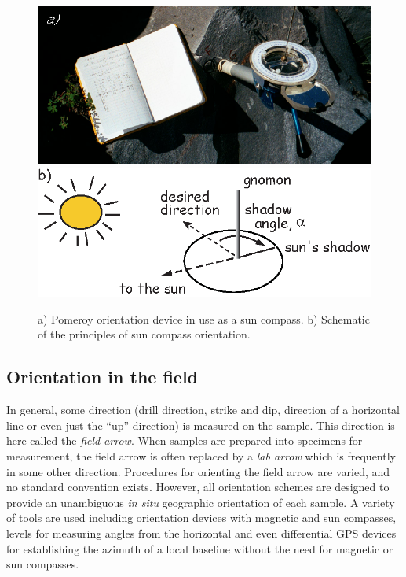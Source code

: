 \begin{figure}[htb]
\centering  \includegraphics[width=11 cm]{EPSfiles/orient.eps}
\centering  \includegraphics{EPSfiles/suncomp.eps}
\caption{a) Pomeroy orientation device in use as a sun compass.  b) Schematic of the principles of sun compass orientation.}
\label{fig:suncomp}
\end{figure}


 \subsection{Orientation in the field}
 
 In general, some direction (drill direction, strike and dip, direction of a horizontal line or even just the ``up'' direction) is measured on the sample.  This direction is here called the {\it field arrow}.  When samples are prepared into specimens for measurement, the field arrow is often replaced by a {\it lab arrow} which is frequently in some other direction.     Procedures for orienting the field arrow are varied, and no standard convention exists. However, all orientation
schemes are designed to provide an unambiguous {\it in situ} geographic orientation of each sample.    A variety of tools are used including orientation devices with magnetic and sun compasses, levels for measuring angles from the horizontal and even differential GPS devices for establishing the azimuth of a local baseline without the need for magnetic or sun compasses.  
 
